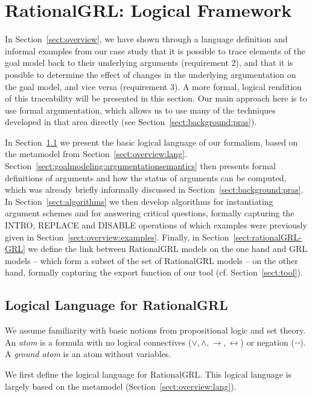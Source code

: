 \section{RationalGRL: Logical Framework}
\label{sect:formalframework}

In Section~\ref{sect:overview}, we have shown through a language definition and informal examples from our case study that it is possible to trace elements of the goal model back to their underlying arguments (requirement 2), and that it is possible to determine the effect of changes in the underlying argumentation on the goal model, and vice versa (requirement 3). A more formal, logical rendition of this traceability will be presented in this section. Our main approach here is to use formal argumentation, which allows us to use many of the techniques developed in that area directly (see Section~\ref{sect:background:pras}).

In Section~\ref{sect:goalmodeling:logicallanguage} we present the basic logical language of our formalism, based on the metamodel from Section~\ref{sect:overview:lang}. Section~\ref{sect:goalmodeling:argumentationsemantics} then presents formal definitions of arguments and how the status of arguments can be computed, which was already briefly informally discussed in Section~\ref{sect:background:pras}. In Section~\ref{sect:algorithms} we then develop algorithms for instantiating argument schemes and for answering critical questions, formally capturing the \textsf{INTRO}, \textsf{REPLACE} and \textsf{DISABLE} operations of which examples were previously given in Section~\ref{sect:overview:examples}. Finally, in Section~\ref{sect:rationalGRL-GRL} we define the link between RationalGRL models on the one hand and GRL models -- which form a subset of the set of RationalGRL models -- on the other hand, formally capturing the export function of our tool (cf. Section~\ref{sect:tool}). 

\subsection{Logical Language for RationalGRL}
\label{sect:goalmodeling:logicallanguage}

We assume familiarity with basic notions from propositional logic and set theory. An \emph{atom} is a formula with no logical connectives ($\vee, \wedge, \rightarrow, \leftrightarrow$) or negation ($\neg$).  A \emph{ground atom} is an atom without variables.

We first define the logical language for RationalGRL. This logical language is largely based on the metamodel (Section~\ref{sect:overview:lang}).

